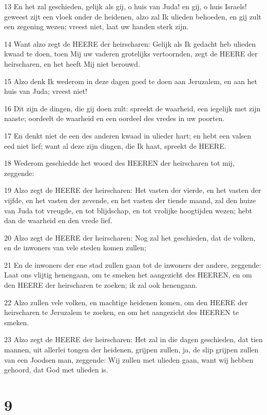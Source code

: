 \par 13 En het zal geschieden, gelijk als gij, o huis van Juda! en gij, o huis Israels! geweest zijt een vloek onder de heidenen, alzo zal Ik ulieden behoeden, en gij zult een zegening wezen; vreest niet, laat uw handen sterk zijn.
\par 14 Want alzo zegt de HEERE der heirscharen: Gelijk als Ik gedacht heb ulieden kwaad te doen, toen Mij uw vaderen grotelijks vertoornden, zegt de HEERE der heirscharen, en het heeft Mij niet berouwd.
\par 15 Alzo denk Ik wederom in deze dagen goed te doen aan Jeruzalem, en aan het huis van Juda; vreest niet!
\par 16 Dit zijn de dingen, die gij doen zult: spreekt de waarheid, een iegelijk met zijn naaste; oordeelt de waarheid en een oordeel des vredes in uw poorten.
\par 17 En denkt niet de een des anderen kwaad in ulieder hart; en hebt een valsen eed niet lief; want al deze zijn dingen, die Ik haat, spreekt de HEERE.
\par 18 Wederom geschiedde het woord des HEEREN der heirscharen tot mij, zeggende:
\par 19 Alzo zegt de HEERE der heirscharen: Het vasten der vierde, en het vasten der vijfde, en het vasten der zevende, en het vasten der tiende maand, zal den huize van Juda tot vreugde, en tot blijdschap, en tot vrolijke hoogtijden wezen; hebt dan de waarheid en den vrede lief.
\par 20 Alzo zegt de HEERE der heirscharen: Nog zal het geschieden, dat de volken, en de inwoners van vele steden komen zullen;
\par 21 En de inwoners der ene stad zullen gaan tot de inwoners der andere, zeggende: Laat ons vlijtig henengaan, om te smeken het aangezicht des HEEREN, en om den HEERE der heirscharen te zoeken; ik zal ook henengaan.
\par 22 Alzo zullen vele volken, en machtige heidenen komen, om den HEERE der heirscharen te Jeruzalem te zoeken, en om het aangezicht des HEEREN te smeken.
\par 23 Alzo zegt de HEERE der heirscharen: Het zal in die dagen geschieden, dat tien mannen, uit allerlei tongen der heidenen, grijpen zullen, ja, de slip grijpen zullen van een Joodsen man, zeggende: Wij zullen met ulieden gaan, want wij hebben gehoord, dat God met ulieden is.

\chapter{9}

